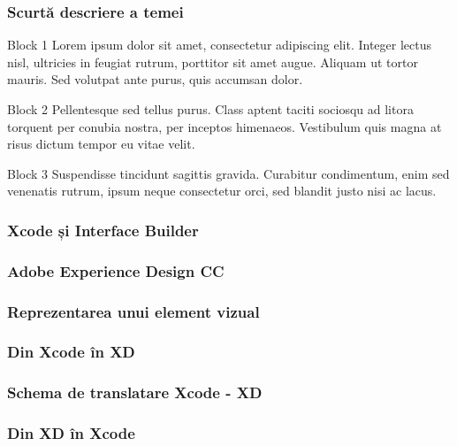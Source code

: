 \documentclass{beamer}
\begin{document}
\begin{frame}
\frametitle{Scurtă descriere a temei}
\begin{block}{Block 1}
Lorem ipsum dolor sit amet, consectetur adipiscing elit. Integer lectus nisl, ultricies in feugiat rutrum, porttitor sit amet augue. Aliquam ut tortor mauris. Sed volutpat ante purus, quis accumsan dolor.
\end{block}

\begin{block}{Block 2}
Pellentesque sed tellus purus. Class aptent taciti sociosqu ad litora torquent per conubia nostra, per inceptos himenaeos. Vestibulum quis magna at risus dictum tempor eu vitae velit.
\end{block}

\begin{block}{Block 3}
Suspendisse tincidunt sagittis gravida. Curabitur condimentum, enim sed venenatis rutrum, ipsum neque consectetur orci, sed blandit justo nisi ac lacus.
\end{block}
\end{frame}


\begin{frame}
\frametitle{Xcode și Interface Builder}
\end{frame}


\begin{frame}
\frametitle{Adobe Experience Design CC}
\end{frame}


\begin{frame}
\frametitle{Reprezentarea unui element vizual}
\end{frame}


\begin{frame}
\frametitle{Din Xcode în XD}
\end{frame}


\begin{frame}
\frametitle{Schema de translatare Xcode - XD}
\end{frame}

\begin{frame}
\frametitle{Din XD în Xcode}
\end{frame}
\end{document}
